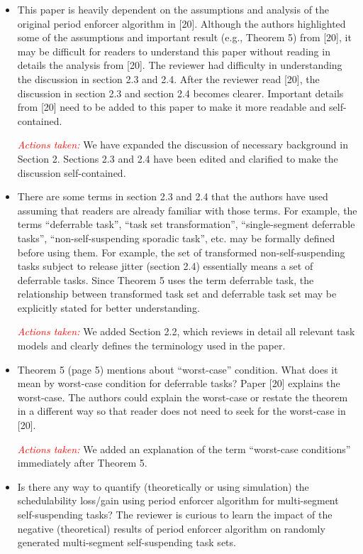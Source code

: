 \documentclass[12pt]{article}
\newcommand{\action}[1]{\textcolor{red}{\emph{\it Actions taken: }}{\color{blue}#1}\medskip}
\begin{document}
\begin{itemize}
	\item   
This paper is heavily dependent on the assumptions and analysis of the
original period enforcer algorithm in [20]. Although the authors highlighted
some of the assumptions and important result (e.g., Theorem 5) from [20], it
may be difficult for readers to understand this paper without reading in
details the analysis from [20]. The reviewer had difficulty in understanding
the discussion in section 2.3 and 2.4. After the reviewer read [20], the
discussion in section 2.3 and section 2.4 becomes clearer. Important details
from [20] need to be added to this paper to make it more readable and
self-contained.

\action{We have expanded the discussion of necessary background in Section 2. Sections 2.3 and 2.4 have been edited and clarified to make the discussion self-contained.}

	\item   
There are some terms in section 2.3 and 2.4 that the authors have used
assuming that readers are already familiar with those terms. For example,
the terms “deferrable task”, “task set transformation”,
“single-segment deferrable tasks”, “non-self-suspending sporadic
task”, etc. may be formally defined before using them. For example, the
set of transformed non-self-suspending tasks subject to release jitter
(section 2.4) essentially means a set of deferrable tasks. Since Theorem 5
uses the term deferrable task, the relationship between transformed task set
and deferrable task set may be explicitly stated for better understanding. 

\action{We added Section 2.2, which reviews in detail all relevant task models  and clearly defines the terminology used in the paper.}
	



	\item   
Theorem 5 (page 5) mentions about “worst-case” condition. What does it
mean by worst-case condition for deferrable tasks? Paper [20] explains the
worst-case. The authors could explain the worst-case or restate the theorem
in a different way so that reader does not need to seek for the worst-case
in [20].   

\action{We added an explanation of the term ``worst-case conditions'' immediately after Theorem 5.}

	\item  
Is there any way to quantify (theoretically or using simulation) the
schedulability loss/gain using period enforcer algorithm for multi-segment
self-suspending tasks? The reviewer is curious to learn the impact of the
negative (theoretical) results of period enforcer algorithm on randomly
generated multi-segment self-suspending task sets.  


\end{itemize}
\end{document}
